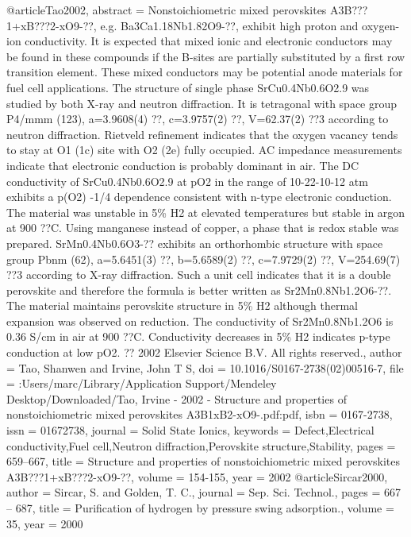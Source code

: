 @article{Tao2002,
abstract = {Nonstoichiometric mixed perovskites A3B???1+xB???2-xO9-??, e.g. Ba3Ca1.18Nb1.82O9-??, exhibit high proton and oxygen-ion conductivity. It is expected that mixed ionic and electronic conductors may be found in these compounds if the B-sites are partially substituted by a first row transition element. These mixed conductors may be potential anode materials for fuel cell applications. The structure of single phase SrCu0.4Nb0.6O2.9 was studied by both X-ray and neutron diffraction. It is tetragonal with space group P4/mmm (123), a=3.9608(4) ??, c=3.9757(2) ??, V=62.37(2) ??3 according to neutron diffraction. Rietveld refinement indicates that the oxygen vacancy tends to stay at O1 (1c) site with O2 (2e) fully occupied. AC impedance measurements indicate that electronic conduction is probably dominant in air. The DC conductivity of SrCu0.4Nb0.6O2.9 at pO2 in the range of 10-22-10-12 atm exhibits a p(O2) -1/4 dependence consistent with n-type electronic conduction. The material was unstable in 5{\%} H2 at elevated temperatures but stable in argon at 900 ??C. Using manganese instead of copper, a phase that is redox stable was prepared. SrMn0.4Nb0.6O3-?? exhibits an orthorhombic structure with space group Pbnm (62), a=5.6451(3) ??, b=5.6589(2) ??, c=7.9729(2) ??, V=254.69(7) ??3 according to X-ray diffraction. Such a unit cell indicates that it is a double perovskite and therefore the formula is better written as Sr2Mn0.8Nb1.2O6-??. The material maintains perovskite structure in 5{\%} H2 although thermal expansion was observed on reduction. The conductivity of Sr2Mn0.8Nb1.2O6 is 0.36 S/cm in air at 900 ??C. Conductivity decreases in 5{\%} H2 indicates p-type conduction at low pO2. ?? 2002 Elsevier Science B.V. All rights reserved.},
author = {Tao, Shanwen and Irvine, John T S},
doi = {10.1016/S0167-2738(02)00516-7},
file = {:Users/marc/Library/Application Support/Mendeley Desktop/Downloaded/Tao, Irvine - 2002 - Structure and properties of nonstoichiometric mixed perovskites A3B1xB2-xO9-.pdf:pdf},
isbn = {0167-2738},
issn = {01672738},
journal = {Solid State Ionics},
keywords = {Defect,Electrical conductivity,Fuel cell,Neutron diffraction,Perovskite structure,Stability},
pages = {659--667},
title = {{Structure and properties of nonstoichiometric mixed perovskites A3B???1+xB???2-xO9-??}},
volume = {154-155},
year = {2002}
}
@article{Sircar2000,
author = {Sircar, S. and Golden, T. C.},
journal = {Sep. Sci. Technol.},
pages = {667 -- 687},
title = {{Purification of hydrogen by pressure swing adsorption.}},
volume = {35},
year = {2000}
}
